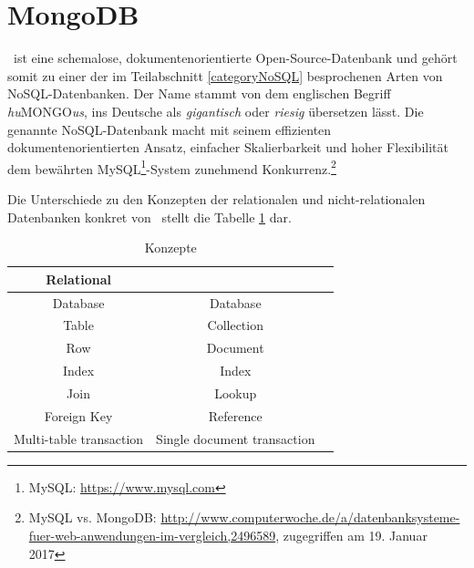 \section{MongoDB}\label{mongo}
\mongo\ ist eine  schemalose, dokumentenorientierte Open-Source-Datenbank und gehört somit zu einer der im Teilabschnitt \ref{categoryNoSQL} besprochenen Arten von NoSQL-Datenbanken. Der Name stammt von dem englischen Begriff \textit{hu}MONGO\textit{us}, ins Deutsche als \textit{gigantisch} oder \textit{riesig} übersetzen lässt. Die genannte NoSQL-Datenbank macht mit seinem effizienten dokumentenorientierten Ansatz, einfacher Skalierbarkeit und hoher Flexibilität dem bewährten MySQL\footnote{MySQL: \url{https://www.mysql.com}}-System zunehmend Konkurrenz.\footnote{MySQL vs. MongoDB: \url{http://www.computerwoche.de/a/datenbanksysteme-fuer-web-anwendungen-im-vergleich,2496589}, zugegriffen am 19. Januar 2017} 

Die Unterschiede zu den Konzepten der relationalen und nicht-relationalen Datenbanken konkret von \mongo\ stellt die Tabelle \ref{table:concepts} dar.

\newcommand*{\head}[1]{\textbf{#1}}%

\begin{table}[H]
\centering
\begin{tabular}{ccc}
  \toprule[1.5pt]
  \head{Relational} & \head{\mongo}\\
  \midrule
  \rmfamily Database & \rmfamily Database\\
    \rmfamily Table & \rmfamily Collection\\ 
      \rmfamily Row & \rmfamily Document\\ 
        \rmfamily Index & \rmfamily Index\\ 
          \rmfamily Join & \rmfamily Lookup\\ 
            \rmfamily Foreign Key & \rmfamily Reference\\ 
              \rmfamily Multi-table transaction & \rmfamily Single document transaction\\ 
  \bottomrule[1.5pt]
\end{tabular}
\caption{Konzepte}
\label{table:concepts}
\end{table}

